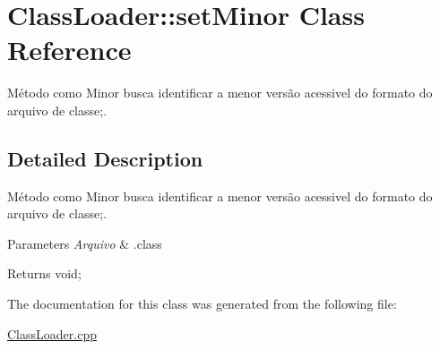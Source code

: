 \hypertarget{class_class_loader_1_1set_minor}{}\section{Class\+Loader\+:\+:set\+Minor Class Reference}
\label{class_class_loader_1_1set_minor}


Método como Minor busca identificar a menor versão acessivel do formato do arquivo de classe;.  




\subsection{Detailed Description}
Método como Minor busca identificar a menor versão acessivel do formato do arquivo de classe;. 


\begin{DoxyParams}{Parameters}
{\em Arquivo} & .class \\
\hline
\end{DoxyParams}
\begin{DoxyReturn}{Returns}
void; 
\end{DoxyReturn}


The documentation for this class was generated from the following file\+:\begin{DoxyCompactItemize}
\item 
\hyperlink{_class_loader_8cpp}{Class\+Loader.\+cpp}\end{DoxyCompactItemize}
